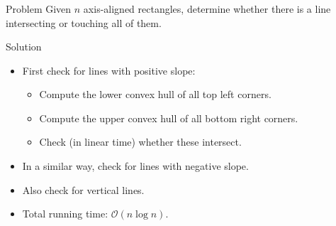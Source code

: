 \begin{frame}
    \frametitle{\problemtitle}
	\begin{block}{Problem}
        Given $n$ axis-aligned rectangles, determine whether there is a line
        intersecting or touching all of them.
    \end{block}

    \begin{block}{Solution}
        \begin{itemize}
            \item<+-> First check for lines with positive slope:
            	\begin{itemize}
            	\item Compute the lower convex hull of all top left corners.
            	\item Compute the upper convex hull of all bottom right corners.
            	\item Check (in linear time) whether these intersect.
            	\end{itemize}
            \item<+-> In a similar way, check for lines with negative slope.
            \item<+-> Also check for vertical lines.
            \item<+-> Total running time: $\mathcal{O}(n \log n)$.
        \end{itemize}
    \end{block}
    \solvestats
\end{frame}
